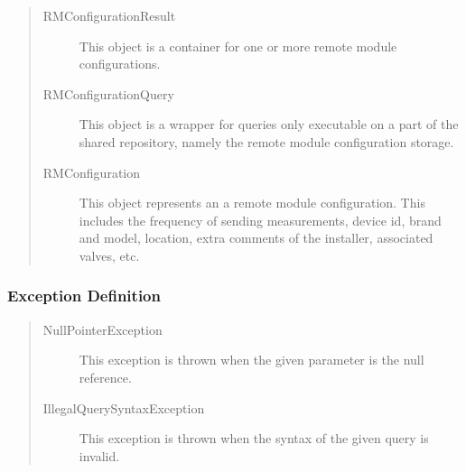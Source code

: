 \begin{quote}
	\begin{description}
		\item[RMConfigurationResult] This object is a container for one or more remote module
		configurations.
		\item[RMConfigurationQuery] This object is a wrapper for queries only executable on a
		part of the shared repository, namely the remote module configuration storage.
		\item[RMConfiguration] This object represents an a remote module
		configuration. This includes the frequency of sending measurements, device id,
		brand and model, location, extra comments of the installer, associated valves,
		etc.
	\end{description} 
\end{quote}

\subsubsection{Exception Definition} 

\begin{quote}
	\begin{description}
		\item[NullPointerException] This exception is thrown when the given parameter
		is the null reference.
		\item[IllegalQuerySyntaxException] This exception is thrown when the syntax of
		the given query is invalid.
	\end{description} 
\end{quote}